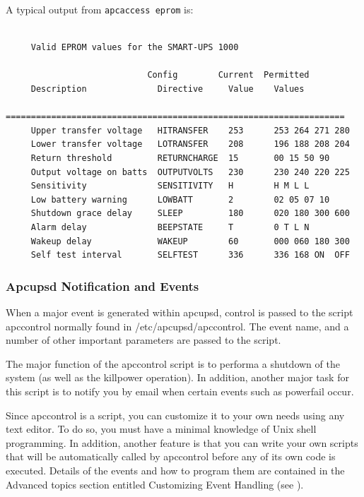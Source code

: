 {{{{A typical output from {\tt apcaccess eprom} is: 

\footnotesize
\begin{verbatim}
     
     Valid EPROM values for the SMART-UPS 1000
     
                            Config        Current  Permitted
     Description              Directive     Value    Values
     ===================================================================
     Upper transfer voltage   HITRANSFER    253      253 264 271 280
     Lower transfer voltage   LOTRANSFER    208      196 188 208 204
     Return threshold         RETURNCHARGE  15       00 15 50 90
     Output voltage on batts  OUTPUTVOLTS   230      230 240 220 225
     Sensitivity              SENSITIVITY   H        H M L L
     Low battery warning      LOWBATT       2        02 05 07 10
     Shutdown grace delay     SLEEP         180      020 180 300 600
     Alarm delay              BEEPSTATE     T        0 T L N
     Wakeup delay             WAKEUP        60       000 060 180 300
     Self test interval       SELFTEST      336      336 168 ON  OFF
\end{verbatim}
\normalsize

\label{Apcupsd-Notification-and-Events}

\subsubsection*{Apcupsd Notification and Events}

\label{index-Notification-116}
\label{index-Events-117}
When a major event is generated within apcupsd, control is passed to the
script apccontrol normally found in /etc/apcupsd/apccontrol. The event name,
and a number of other important parameters are passed to the script.  

The major function of the apccontrol script is to performa a shutdown of the
system (as well as the killpower operation). In addition, another major task
for this script is to notify you by email when certain events such as
powerfail occur.  

Since apccontrol is a script, you can customize it to your own needs using any
text editor. To do so, you must have a minimal knowledge of Unix shell
programming. In addition, another feature is that you can write your own
scripts that will be automatically called by apccontrol before any of its own
code is executed. Details of the events and how to program them are contained
in the Advanced topics section entitled Customizing Event Handling (see 
). 

}}}}
